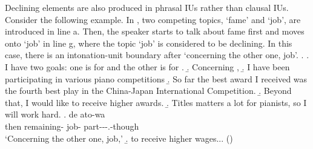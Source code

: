 Declining elements are also produced in phrasal IUs rather than clausal IUs.
Consider the following example.
In \Next,
two competing topics,  `fame' and  `job',
are introduced in line a.
Then, the speaker starts to talk about fame first and moves onto `job' in line g,
where the topic  `job' is considered to be declining.
In this case, there is an intonation-unit boundary after  `concerning the other one, job'.
%
\ex.
 \a. I have two goals: one is for  and the other is for .
 \b. Concerning ,
 \b. I have been participating in various piano competitions
 \b. So far the best award I received was the fourth best play in the China-Japan International Competition.
 \b. Beyond that, I would like to receive higher awards.
 \b. Titles matters a lot for pianists, so I will work hard.
 \bg. de {\iub} ato-wa {\iub}  {\iub}  {\iub} \\
 	then {} remaining- {} job- {} part---.-though {} \\
	`Concerning the other one, job,'
 \b. to receive higher wages...
\hfill{()}
%


%


